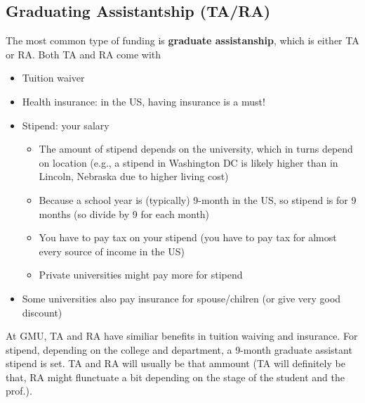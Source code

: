 \documentclass[10pt]{article}
\begin{document}
\subsection{Graduating Assistantship (TA/RA)}
The most common type of funding is \textbf{graduate assistanship}, which is either TA or RA. Both TA and RA come with
\begin{itemize}
\item Tuition waiver
\item Health insurance: in the US, having insurance is a must!
\item Stipend: your salary
  \begin{itemize}
  \item The amount of stipend depends on the university, which in turns depend on location (e.g., a stipend in Washington DC is likely higher than in Lincoln, Nebraska due to higher living cost)
  \item Because a school year is (typically) 9-month in the US, so stipend is for 9 months (so divide by 9 for each month)
  \item You have to pay tax on your stipend (you have to pay tax for almost every source of income in the US)
  \item Private universities might pay more for stipend
  \end{itemize}
\item Some universities also pay insurance for spouse/chilren (or give very good discount)
\end{itemize}

\begin{tcolorbox}[left=1pt,right=1pt,top=1pt,bottom=1pt]
At GMU, TA and RA have similiar benefits in tuition waiving and insurance.  For stipend, depending on the college and department, a 9-month graduate assistant stipend is set.  TA and RA will usually be that ammount (TA will definitely be that, RA might flunctuate a bit depending on the stage of the student and the prof.). 
\end{tcolorbox}
\end{document}

